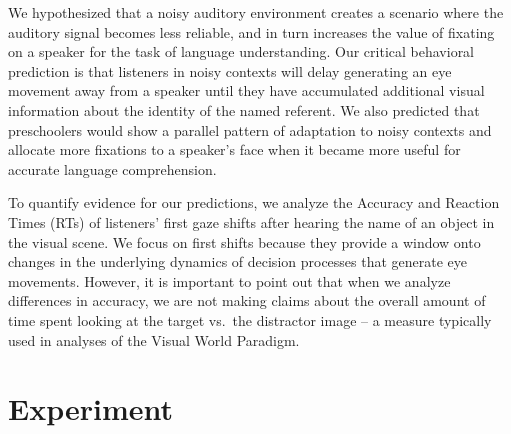 \documentclass[10pt, letterpaper]{article}
\begin{document}
We hypothesized that a noisy auditory environment creates a scenario
where the auditory signal becomes less reliable, and in turn increases
the value of fixating on a speaker for the task of language
understanding. Our critical behavioral prediction is that listeners in
noisy contexts will delay generating an eye movement away from a speaker
until they have accumulated additional visual information about the
identity of the named referent. We also predicted that preschoolers
would show a parallel pattern of adaptation to noisy contexts and
allocate more fixations to a speaker's face when it became more useful
for accurate language comprehension.

To quantify evidence for our predictions, we analyze the Accuracy and
Reaction Times (RTs) of listeners' first gaze shifts after hearing the
name of an object in the visual scene. We focus on first shifts because
they provide a window onto changes in the underlying dynamics of
decision processes that generate eye movements. However, it is important
to point out that when we analyze differences in accuracy, we are not
making claims about the overall amount of time spent looking at the
target vs.~the distractor image -- a measure typically used in analyses
of the Visual World Paradigm.

\section{Experiment}\label{experiment}
\end{document}
